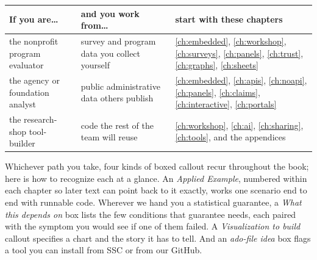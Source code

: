 \documentclass[
    a4paper,
    fontsize=10pt,
    twoside=true,
    numbers=noenddot,
]{kaobook}
\begin{document}
\begin{table}[htbp]
\centering
\begin{tabular}{@{}p{3.5cm}p{4.6cm}p{5.0cm}@{}}
\toprule
\textbf{If you are\ldots} & \textbf{and you work from\ldots} & \textbf{start with these chapters} \\
\midrule
the nonprofit program evaluator & survey and program data you collect yourself & \ref{ch:embedded}, \ref{ch:workshop}, \ref{ch:surveys}, \ref{ch:panels}, \ref{ch:trust}, \ref{ch:graphs}, \ref{ch:sheets} \\
\addlinespace
the agency or foundation analyst & public administrative data others publish & \ref{ch:embedded}, \ref{ch:apis}, \ref{ch:noapi}, \ref{ch:panels}, \ref{ch:claims}, \ref{ch:interactive}, \ref{ch:portals} \\
\addlinespace
the research-shop tool-builder & code the rest of the team will reuse & \ref{ch:workshop}, \ref{ch:ai}, \ref{ch:sharing}, \ref{ch:tools}, and the appendices \\
\bottomrule
\end{tabular}
\end{table}

\noindent Whichever path you take, four kinds of boxed callout recur throughout the book; here is how to recognize each at a glance. An \emph{Applied Example}, numbered within each chapter so later text can point back to it exactly, works one scenario end to end with runnable code. Wherever we hand you a statistical guarantee, a \emph{What this depends on} box lists the few conditions that guarantee needs, each paired with the symptom you would see if one of them failed. A \emph{Visualization to build} callout specifies a chart and the story it has to tell. And an \emph{ado-file idea} box flags a tool you can install from SSC or from our GitHub.


\end{document}
